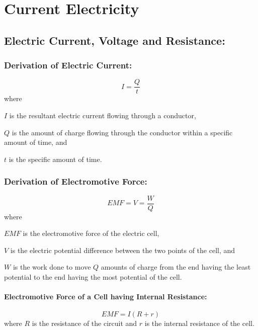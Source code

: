 \documentclass[a4paper]{report}
\begin{document}
\addtocounter{chapter}{2}
\chapter{Current Electricity}
    \section{Electric Current, Voltage and Resistance:}
        \subsection{Derivation of Electric Current:}
            \begin{equation}
                I = \frac{Q}{t}
            \end{equation}
            where
            \begin{description}
                \item $I$ is the resultant electric current flowing through a conductor,
                \item $Q$ is the amount of charge flowing through the conductor within a specific amount of time, and
                \item $t$ is the specific amount of time. 
            \end{description}
        \subsection{Derivation of Electromotive Force:}
            \begin{equation}
                EMF = V = \frac{W}{Q}
            \end{equation}
            where
            \begin{description}
                \item $EMF$ is the electromotive force of the electric cell,
                \item $V$ is the electric potential difference between the two points of the cell, and
                \item $W$ is the work done to move $Q$ amounts of charge from the end having the least potential to the end having the most potential of the cell. 
            \end{description}
            \subsubsection{Electromotive Force of a Cell having Internal Resistance:}
                \begin{equation}
                    EMF = I(R + r)
                \end{equation}
                where $R$ is the resistance of the circuit and $r$ is the internal resistance of the cell.
\end{document}
